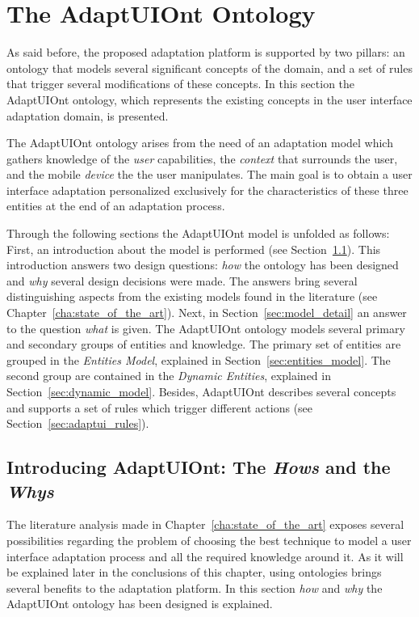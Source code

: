 \section{The AdaptUIOnt Ontology}
\label{sec:adaptui_model}

As said before, the proposed adaptation platform is supported by two pillars: an 
ontology that models several significant concepts of the domain, and a set of 
rules that trigger several modifications of these concepts. In this section the
AdaptUIOnt ontology, which represents the existing concepts in the user interface 
adaptation domain, is presented.
  
The AdaptUIOnt ontology arises from the need of an adaptation model which gathers
knowledge of the \textit{user} capabilities, the \textit{context} that surrounds
the user, and the mobile \textit{device} the the user manipulates. The main goal
is to obtain a user interface adaptation personalized exclusively for the
characteristics of these three entities at the end of an adaptation process.

Through the following sections the AdaptUIOnt model is unfolded as follows: 
First, an introduction about the model is performed (see Section~\ref{sec:model_introduction}).
This introduction answers two design questions: \textit{how} the ontology has
been designed and \textit{why} several design decisions were made. The answers
bring several distinguishing aspects from the existing models found in the
literature (see Chapter~\ref{cha:state_of_the_art}). Next, in Section~\ref{sec:model_detail}
an answer to the question \textit{what} is given. The AdaptUIOnt ontology models
several primary and secondary groups of entities and knowledge. The primary
set of entities are grouped in the \textit{Entities Model}, explained in
Section~\ref{sec:entities_model}. The second group are contained in the
\textit{Dynamic Entities}, explained in Section~\ref{sec:dynamic_model}. Besides,
AdaptUIOnt describes several concepts and supports a set of rules which trigger
different actions (see Section~\ref{sec:adaptui_rules}).


\subsection{Introducing AdaptUIOnt: The \textit{Hows} and the \textit{Whys}}
\label{sec:model_introduction}

The literature analysis made in Chapter~\ref{cha:state_of_the_art} exposes
several possibilities regarding the problem of choosing the best technique
to model a user interface adaptation process and all the required knowledge
around it. As it will be explained later in the conclusions of this chapter, 
using ontologies brings several benefits to the adaptation platform. In this 
section \textit{how} and \textit{why} the AdaptUIOnt ontology has been designed
is explained.

